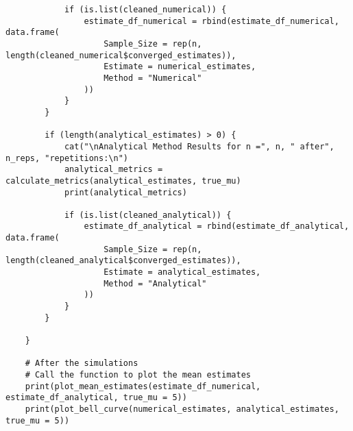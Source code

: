 \documentclass{report}
\begin{document}
\begin{verbatim}
            if (is.list(cleaned_numerical)) {
                estimate_df_numerical = rbind(estimate_df_numerical, data.frame(
                    Sample_Size = rep(n, length(cleaned_numerical$converged_estimates)),
                    Estimate = numerical_estimates,
                    Method = "Numerical"
                ))
            }
        }
    
        if (length(analytical_estimates) > 0) {
            cat("\nAnalytical Method Results for n =", n, " after", n_reps, "repetitions:\n")
            analytical_metrics = calculate_metrics(analytical_estimates, true_mu)
            print(analytical_metrics)
    
            if (is.list(cleaned_analytical)) {
                estimate_df_analytical = rbind(estimate_df_analytical, data.frame(
                    Sample_Size = rep(n, length(cleaned_analytical$converged_estimates)),
                    Estimate = analytical_estimates,
                    Method = "Analytical"
                ))
            }
        }
     
    }
    
    # After the simulations
    # Call the function to plot the mean estimates
    print(plot_mean_estimates(estimate_df_numerical, estimate_df_analytical, true_mu = 5))
    print(plot_bell_curve(numerical_estimates, analytical_estimates, true_mu = 5))
\end{verbatim}

\end{document}
